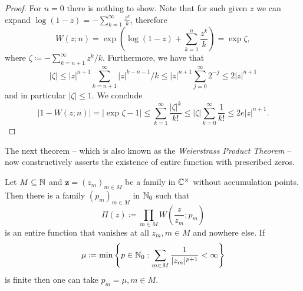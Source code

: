 \begin{proof}
    For $n = 0$ there is nothing to show. Note that for such given $z$ we can expand $\log (1 - z) = - \sum_{k=1}^\infty \frac{z^k}{k}$, therefore
    \begin{equation*}
        W(z; n) = \exp \left( \log(1-z) + \sum_{k=1}^n \frac{z^k}{k} \right) = \exp \zeta,
    \end{equation*}
    where $\zeta \coloneqq - \sum_{k=n+1}^\infty z^k / k$. Furthermore, we have that
    \begin{equation*}
        \vert \zeta \vert \leq \vert z \vert^{n+1} \sum_{k=n+1}^\infty \vert z \vert^{k-n-1} / k \leq \vert z \vert^{n+1} \sum_{j=0}^\infty 2^{-j} \leq 2 \vert z \vert^{n+1}
    \end{equation*}
    and in particular $\vert \zeta \vert \leq 1$. We conclude
    \begin{equation*}
        \vert 1 - W(z; n) \vert = \vert \exp \zeta - 1 \vert \leq \sum_{k=1}^\infty \frac{\vert \zeta \vert^k}{k!} \leq \vert \zeta \vert \sum_{k=0}^\infty \frac{1}{k!} \leq 2 e \vert z \vert^{n+1}.
    \end{equation*}
\end{proof}

The next theorem -- which is also known as the \emph{Weierstrass Product Theorem} -- now constructively asserts the existence of entire function with prescribed zeros.

\begin{theorem} \label{thm:function-with-prescribed-zeros}
    Let $M \subseteq \mathbb{N}$ and $\mathbf{z} = (z_m)_{m \in M}$ be a family in $\mathbb{C}^\times$ without accumulation points. Then there is a family $(p_m)_{m \in M}$ in $\mathbb{N}_0$ such that
    \begin{equation}
        \Pi(z) \coloneqq \prod_{m \in M} W\left(\frac{z}{z_m}; p_m\right)
    \end{equation}
    is an entire function that vanishes at all $z_m, m \in M$ and nowhere else. If
    \begin{equation}
        \mu \coloneqq \min \left\{ p \in \mathbb{N}_0 : \sum_{m \in M} \frac{1}{\vert z_m \vert^{p+1}} < \infty \right\}
    \end{equation}
    is finite then one can take $p_m = \mu, m \in M$.
\end{theorem}

